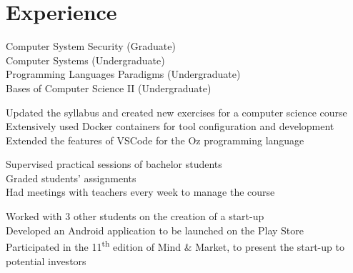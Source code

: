 \documentclass[]{deedy-resume-openfont}
\begin{document}
\begin{minipage}[t]{0.60\textwidth} 


\vspace{-5pt}
\section{Experience}

\textbullet{} Computer System Security (Graduate) \\
\textbullet{} Computer Systems (Undergraduate) \\
\textbullet{} Programming Languages Paradigms (Undergraduate) \\
\textbullet{} Bases of Computer Science II (Undergraduate) \\
\sectionsep

\textbullet{} Updated the syllabus and created new exercises for a computer science course \\
\textbullet{} Extensively used Docker containers for tool configuration and development \\
\textbullet{} Extended the features of VSCode for the Oz programming language \\
\sectionsep

\textbullet{} Supervised practical sessions of bachelor students \\
\textbullet{} Graded students' assignments \\
\textbullet{} Had meetings with teachers every week to manage the course \\
\sectionsep

\textbullet{} Worked with 3 other students on the creation of a start-up \\
\textbullet{} Developed an Android application to be launched on the Play Store \\
\textbullet{} Participated in the 11\textsuperscript{th} edition of Mind \& Market, to present the start-up to potential investors \\
\sectionsep



\end{minipage}
\end{document}

